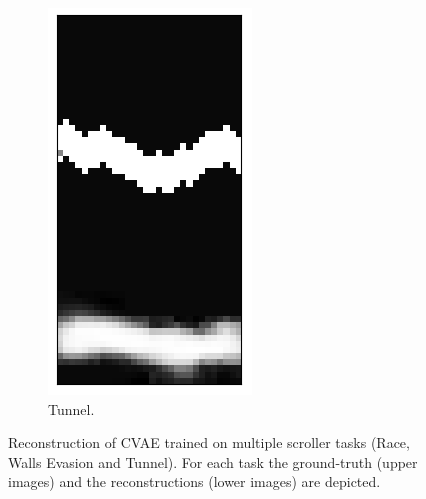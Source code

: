 \begin{figure}[t!]
\begin{subfigure}{0.3\columnwidth}
		\includegraphics[width=\linewidth]{documentation/report/img/cvae_scroll_tunn.png}
		\caption{Tunnel.}
		\label{subfig:cvae_scroll_tunnel}
	\end{subfigure}

	\caption{Reconstruction of CVAE trained on multiple scroller tasks (Race, Walls Evasion and Tunnel). For each task the ground-truth (upper images) and the reconstructions (lower images) are depicted.}
	\label{fig:cvae_multitask}
\end{figure}


